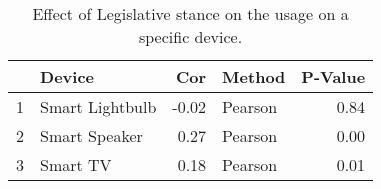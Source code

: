 \begin{table}[ht]
\centering
\begin{tabular}{rlrlr}
  \hline
 & Device & Cor & Method & P-Value \\ 
  \hline
1 & Smart Lightbulb & -0.02 & Pearson & 0.84 \\ 
  2 & Smart Speaker & 0.27 & Pearson & 0.00 \\ 
  3 & Smart TV & 0.18 & Pearson & 0.01 \\ 
   \hline
\end{tabular}
\caption{Effect of Legislative stance on the usage on a specific device.} 
\end{table}
